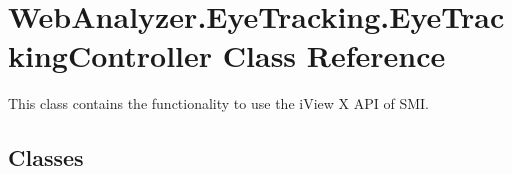 \hypertarget{class_web_analyzer_1_1_eye_tracking_1_1_eye_tracking_controller}{}\section{Web\+Analyzer.\+Eye\+Tracking.\+Eye\+Tracking\+Controller Class Reference}
\label{class_web_analyzer_1_1_eye_tracking_1_1_eye_tracking_controller}


This class contains the functionality to use the i\+View X A\+P\+I of S\+M\+I.  


\subsection*{Classes}
